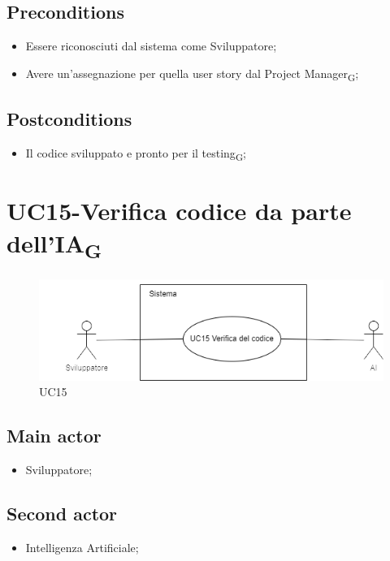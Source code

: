 \documentclass{article}
\begin{document}
    \subsection*{Preconditions}
        \begin{itemize}
            \item Essere riconosciuti dal sistema come Sviluppatore;
            \item Avere un'assegnazione per quella user story dal Project Manager\textsubscript{G};
        \end{itemize}
        
    \subsection*{Postconditions} 
        \begin{itemize}
            \item Il codice sviluppato e pronto per il testing\textsubscript{G};
        \end{itemize}
        
\section{UC15-Verifica codice da parte dell'IA\textsubscript{G}}
    \begin{figure}[h]
      \centering
      \includegraphics{./imgUML/UC15.png}
        \caption{UC15}
      \label{fig:UC15}
    \end{figure}
    
    \subsection*{Main actor}
        \begin{itemize}
            \item Sviluppatore;
        \end{itemize}
    \subsection*{Second actor}
        \begin{itemize}
            \item Intelligenza Artificiale;
        \end{itemize}
    
\end{document}
